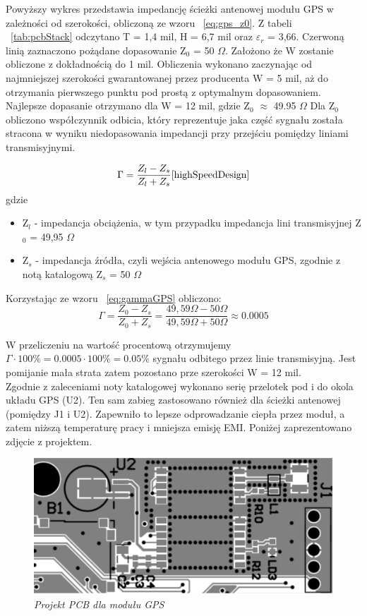 \documentclass[eng,printmode]{mgr}
\begin{document}
Powyższy wykres przedstawia impedancję ścieżki antenowej modułu GPS w zależności od szerokości, obliczoną ze wzoru ~\ref{eq:gps_z0}. Z tabeli ~\ref{tab:pcbStack} odczytano T = 1,4 mil, H = 6,7 mil oraz \textbf{$\varepsilon_r$} = 3,66. Czerwoną linią zaznaczono pożądane dopasowanie Z$_0$ = 50 $\Omega$. Założono że W zostanie obliczone z dokładnością do 1 mil. Obliczenia wykonano zaczynając od najmniejszej szerokości gwarantowanej przez producenta W = 5 mil, aż do otrzymania pierwszego punktu pod prostą z optymalnym dopasowaniem. Najlepsze dopasanie otrzymano dla W = 12 mil, gdzie Z$_0$ $\approx$ 49.95 $\Omega$
Dla Z$_0$ obliczono współczynnik odbicia, który reprezentuje jaka część sygnału została stracona w wyniku niedopasowania impedancji przy przejściu pomiędzy liniami transmisyjnymi.

\begin{equation}
\Gamma= \frac{Z_l - Z_s}{Z_l + Z_s} \label{eq:gammaGPS} \cite{highSpeedDesign}
\end{equation}
gdzie
\begin{itemize}
  \item Z$_l$ - impedancja obciążenia, w tym przypadku impedancja lini transmisyjnej Z$_0$ = 49,95 $ \Omega$
  \item Z$_s$ - impedancja źródła, czyli wejścia antenowego modułu GPS, zgodnie z notą katalogową Z$_s$ = 50 $\Omega$
\end{itemize}
\noindent
Korzystając ze wzoru ~\ref{eq:gammaGPS} obliczono:
\begin{equation}
\Gamma= \frac{Z_0 - Z_s}{Z_0 + Z_s} = \frac{49,59\Omega -50\Omega}{49,59\Omega  + 50\Omega } \approx 0.0005 
\end{equation}

W przeliczeniu na wartość procentową otrzymujemy $\Gamma \cdot 100\% = 0.0005 \cdot 100\% = 0.05\%$ sygnału odbitego przez linie transmisyjną. Jest pomijanie mała strata zatem pozostano prze szerokości W = 12 mil.\\

Zgodnie z zaleceniami noty katalogowej wykonano serię przelotek pod i do okola układu GPS (U2). Ten sam zabieg zastosowano również dla ścieżki antenowej (pomiędzy J1 i U2). Zapewniło to lepsze odprowadzanie ciepła przez moduł, a zatem niższą temperaturę pracy i mniejsza emisję EMI. Poniżej zaprezentowano zdjęcie z projektem.
\begin{figure}[!h]
    \centering
    \includegraphics[width=15cm]{pcb/gps.png}
    \caption{\textit{Projekt PCB dla modułu GPS}}
\end{figure}
\end{document}
